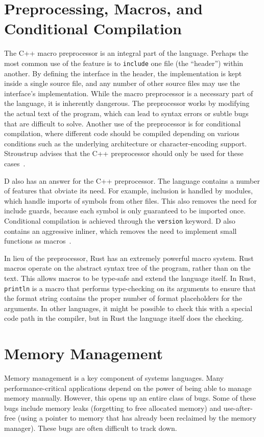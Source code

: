 \documentclass[draftcopy,nolof,nolot]{srpaper}
\begin{document}
\section{Preprocessing, Macros, and Conditional Compilation}

The C++ macro preprocessor is an integral part of the language. Perhaps the
most common use of the feature is to \texttt{include} one file (the ``header'')
within another. By defining the interface in the header, the implementation is
kept inside a single source file, and any number of other source files may use
the interface's implementation. While the macro preprocessor is a necessary
part of the language, it is inherently dangerous. The preprocessor works by
modifying the actual text of the program, which can lead to syntax errors or
subtle bugs that are difficult to solve. Another use of the preprocessor is
for conditional compilation, where different code should be compiled depending
on various conditions such as the underlying architecture or character-encoding
support. Stroustrup advises that the C++ preprocessor should only be used for
these cases~\cite{stroustrup2013the}.

D also has an answer for the C++ preprocessor. The language contains a number
of features that obviate its need. For example, inclusion is handled by
modules, which handle imports of symbols from other files. This also removes
the need for include guards, because each symbol is only guaranteed to be
imported once. Conditional compilation is achieved through the
\texttt{version} keyword. D also contains an aggressive inliner, which removes
the need to implement small functions as macros~\cite{pretod}.

In lieu of the preprocessor, Rust has an extremely powerful macro system.
Rust macros operate on the abstract syntax tree of the program, rather than on
the text. This allows macros to be type-safe and extend the language itself.
In Rust, \texttt{println} is a macro that performs type-checking on its
arguments to ensure that the format string contains the proper number of
format placeholders for the arguments. In other languages, it might be
possible to check this with a special code path in the compiler, but in Rust
the language itself does the checking.

\section{Memory Management}

Memory management is a key component of systems languages. Many
performance-critical applications depend on the power of being able to manage
memory manually. However, this opens up an entire class of bugs. Some of these
bugs include memory leaks (forgetting to free allocated memory) and
use-after-free (using a pointer to memory that has already been reclaimed by
the memory manager). These bugs are often difficult to track down.
\end{document}
